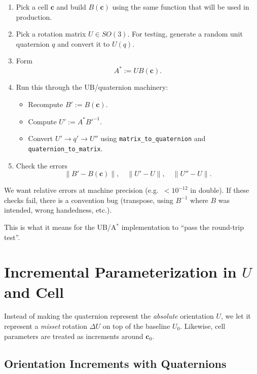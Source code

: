 \documentclass[11pt]{article}
\begin{document}
\begin{enumerate}
  \item Pick a cell $\mathbf{c}$ and build $B(\mathbf{c})$
        using the same function that will be used in production.
  \item Pick a rotation matrix $U \in SO(3)$.
        For testing, generate a random unit quaternion $q$ and convert it to
        $U(q)$.
  \item Form
        \begin{equation}
          A^\ast := U B(\mathbf{c}).
        \end{equation}
  \item Run this through the UB/quaternion machinery:
        \begin{itemize}
          \item Recompute $B' := B(\mathbf{c})$.
          \item Compute $U' := A^\ast {B'}^{-1}$.
          \item Convert $U' \to q' \to U''$ using
                \verb|matrix_to_quaternion| and \verb|quaternion_to_matrix|.
        \end{itemize}
  \item Check the errors
        \begin{equation}
          \|B' - B(\mathbf{c})\|,\quad
          \|U' - U\|,\quad
          \|U'' - U\|.
        \end{equation}
\end{enumerate}

We want relative errors at machine precision (e.g.\ $< 10^{-12}$ in double).
If these checks fail, there is a convention bug (transpose, using $B^{-1}$ where
$B$ was intended, wrong handedness, etc.).

This is what it means for the UB/A$^\ast$ implementation to ``pass the
round-trip test''.

\section{Incremental Parameterization in $U$ and Cell}

Instead of making the quaternion represent the \emph{absolute} orientation $U$,
we let it represent a \emph{misset} rotation $\Delta U$ on top of the baseline
$U_0$. Likewise, cell parameters are treated as increments around
$\mathbf{c}_0$.

\subsection{Orientation Increments with Quaternions}
\end{document}
